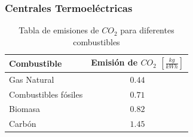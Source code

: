         \subsubsection{Centrales Termoeléctricas}
        
            
            \begin{quote}
                \textit{}
            \end{quote}
            
            \begin{table}[H]
            \caption{Tabla de emisiones de \(CO_{2}\) para diferentes combustibles}
            \label{tabla_emision_co2}
                \begin{tabular}{|l|c|}
                    \hline
                    \rowcolor[HTML]{FE0000} {\color[HTML]{FFFFFF} \textbf{Combustible}} & {\color[HTML]{FFFFFF} \textbf{Emisión de \(CO_{2}\) \(\left [ \frac{kg}{kWh} \right ]\)}} \\ \hline
                    Gas Natural                                 & \(0.44\)                                                                                                          \\ \hline
                    Combustibles fósiles                        & \(0.71\)                                                                                                          \\ \hline
                    Biomasa                                     & \(0.82\)                                                                                                          \\ \hline
                    Carbón                                      & \(1.45\)                                                                                                          \\ \hline
                \end{tabular}
            \end{table}
            
